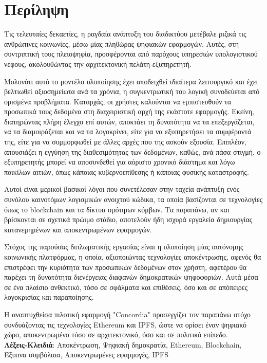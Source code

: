 \chapter*{Περίληψη}

Τις τελευταίες δεκαετίες, η ραγδαία ανάπτυξη του διαδικτύου μετέβαλε ριζικά τις ανθρώπινες
κοινωνίες, μέσω μίας πληθώρας ψηφιακών εφαρμογών. Αυτές, στη συντριπτική τους πλειοψηφία, προσφέρονται από παρόχους υπηρεσιών υπολογιστικού νέφους, ακολουθώντας την αρχιτεκτονική πελάτη-εξυπηρετητή.

Μολονότι αυτό το μοντέλο υλοποίησης έχει αποδειχθεί ιδιαίτερα λειτουργικό και έχει βελτιωθεί αξιοσημείωτα ανά τα χρόνια, η συγκεντρωτική του λογική συνοδεύεται από ορισμένα προβλήματα. Καταρχάς, οι χρήστες καλούνται να εμπιστευθούν τα προσωπικά τους δεδομένα στη διαχειριστική αρχή της εκάστοτε εφαρμογής. Εκείνη, διατηρώντας πλήρη έλεγχο επί αυτών, αποκτάει τη δυνατότητα να τα επεξεργάζεται, να τα διαμοιράζεται και να τα λογοκρίνει, είτε για να εξυπηρετήσει τα συμφέροντά της, είτε για να συμμορφωθεί με άλλες αρχές που της ασκούν εξουσία. Επιπλέον, απουσιάζει η εγγύηση της διαθεσιμότητας των δεδομένων, καθώς, ανά πάσα στιγμή, ο εξυπηρετητής μπορεί να αποσυνδεθεί για αόριστο χρονικό διάστημα και λόγω ποικίλων αιτιών, όπως κάποιας κυβερνοεπίθεσης ή κάποιας φυσικής καταστροφής.

Αυτοί είναι μερικοί βασικοί λόγοι που συνετέλεσαν στην ταχεία ανάπτυξη ενός συνόλου καινοτόμων λογισμικών ανοιχτού κώδικα, τα οποία βασίζονται σε τεχνολογίες όπως το blockchain και τα δίκτυα ομότιμων κόμβων. Τα παραπάνω, αν και βρίσκονται σε σχετικά πρώιμο στάδιο, αποτελούν ήδη ισχυρά εργαλεία δημιουργίας κατανεμημένων και αποκεντρωμένων εφαρμογών.

Στόχος της παρούσας διπλωματικής εργασίας είναι η υλοποίηση μίας αυτόνομης κοινωνικής πλατφόρμας,
η οποία, αξιοποιώντας τεχνολογίες αποκέντρωσης, αφενός θα επιστρέφει την κυριότητα των προσωπικών
δεδομένων στον χρήστη, αφετέρου θα παρέχει τη δυνατότητα διενέργειας διαφανών δημοκρατικών ψηφοφοριών. Αυτά μέσα σε ένα πλαίσιο ανθεκτικό, τόσο σε σφάλματα και επιθέσεις, όσο και σε απόπειρες λογοκρισίας και παραποίησης.

Η αναπτυχθείσα πιλοτική εφαρμογή "Concordia" προσεγγίζει τον παραπάνω στόχο συνδυάζοντας τις τεχνολογίες Ethereum και IPFS, ώστε να ορίσει έναν ψηφιακό χώρο, αποκεντρωμένο τόσο σε αρχιτεκτονικό, όσο και σε πολιτικό επίπεδο.
\\[2\baselineskip]
\textbf{Λέξεις-Κλειδιά}: Αποκέντρωση, Ψηφιακή δημοκρατία, Ethereum, Blockchain, Έξυπνα συμβόλαια, Αποκεντρωμένες εφαρμογές, IPFS